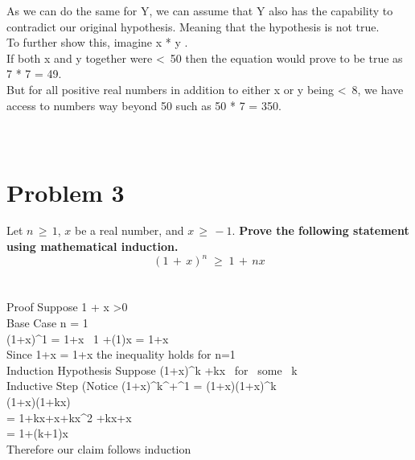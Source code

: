 \begin{enumerate}[label=(\alph*)]
  As we can do the same for Y, we can assume that Y also has the capability to contradict our original hypothesis. Meaning that the hypothesis is not true.\\
  
  To further show this, imagine x * y . \\
  
  If both x and y together were \textless \ 50 then the equation would prove to be true as 7 * 7 = 49. \\
  
  But for all positive real numbers in addition to either x or y being \textless \ 8, we have access to numbers way beyond 50 such as 50 * 7 = 350. \\
  
  
\\\\
  \end{enumerate}
  \newpage
  \section*{Problem 3}
  Let $n\, \geq \, 1$, $x$ be a real number, and $x\, \geq\,-1$. {\bf Prove the following statement using mathematical induction.}
  \[(1\,+\,x)^n\;\geq\;1\,+\,nx\]
\\\\
Proof Suppose 1 + x \textgreater 0 \\

Base Case n = 1 \\
(1+x)^1 = 1+x \ 1 +(1)x = 1+x \\

Since 1+x = 1+x the inequality holds for n=1 \\

Induction Hypothesis Suppose (1+x)^k +kx \ for \ some \ k \in \Z \\

Inductive Step (Notice (1+x)^k^+^1 = (1+x)(1+x)^k \\
\geq (1+x)(1+kx) \\
= 1+kx+x+kx^2 +kx+x \\
= 1+(k+1)x \\

Therefore our claim follows induction


\\\\
\newpage
